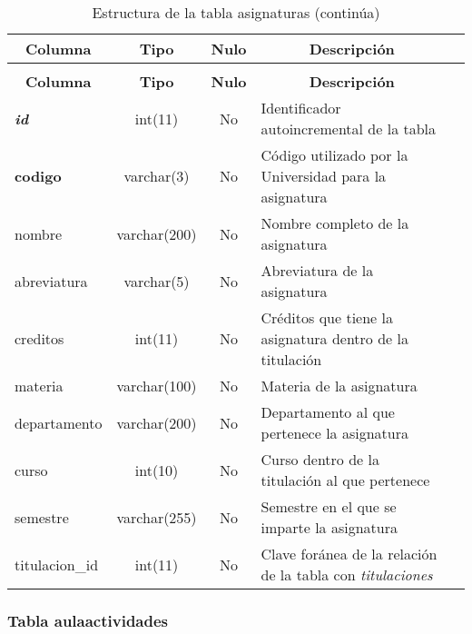 %
%
 \begin{longtable}{|l|c|c|l|l|} 
 \caption{Estructura de la tabla asignaturas} \label{tab:asignaturas-structure} \\
 \hline \multicolumn{1}{|c|}{\textbf{Columna}} & \multicolumn{1}{|c|}{\textbf{Tipo}} & \multicolumn{1}{|c|}{\textbf{Nulo}} & \multicolumn{1}{|c|}{\textbf{Descripción}} \\ \hline \hline
\endfirsthead
 \caption{Estructura de la tabla asignaturas (continúa)} \\ 
 \hline \multicolumn{1}{|c|}{\textbf{Columna}} & \multicolumn{1}{|c|}{\textbf{Tipo}} & \multicolumn{1}{|c|}{\textbf{Nulo}} & \multicolumn{1}{|c|}{\textbf{Descripción}}  \\ \hline \hline \endhead \endfoot 
\textbf{\textit{id}} & int(11) & No & Identificador autoincremental de la tabla\\ \hline 
\textbf{codigo} & varchar(3) & No & Código utilizado por la Universidad para la asignatura\\ \hline 
nombre & varchar(200) & No & Nombre completo de la asignatura \\ \hline 
abreviatura & varchar(5) & No & Abreviatura de la asignatura \\ \hline 
creditos & int(11) & No & Créditos que tiene la asignatura dentro de la titulación \\ \hline 
materia & varchar(100) & No & Materia de la asignatura \\ \hline 
departamento & varchar(200) & No & Departamento al que pertenece la asignatura \\ \hline 
curso & int(10)  & No & Curso dentro de la titulación al que pertenece \\ \hline 
semestre & varchar(255) & No & Semestre en el que se imparte la asignatura \\ \hline 
titulacion\_id & int(11) & No & Clave foránea de la relación de la tabla con {\em titulaciones} \\ \hline 
 \end{longtable}

\subsubsection{Tabla aulaactividades}

